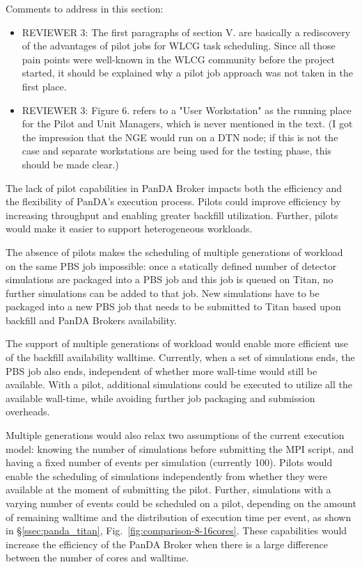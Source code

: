 \ifreview
Comments to address in this section:
\begin{itemize}
	\color{red} 
	\item REVIEWER 3: The first paragraphs of section V. are basically a
	rediscovery of the advantages of pilot jobs for WLCG task scheduling.
	Since all those pain points were well-known in the WLCG community before
	the project started, it should be explained why a pilot job approach was
	not taken in the first place.
	\item REVIEWER 3: Figure 6. refers to a "User Workstation" as the running
	place for the Pilot and Unit Managers, which is never mentioned in the
	text. (I got the impression that the NGE would run on a DTN node; if this
	is not the case and separate workstations are being used for the testing
	phase, this should be made clear.)
\end{itemize}
\fi

The lack of pilot capabilities in PanDA Broker impacts both the efficiency
and the flexibility of PanDA's execution process. Pilots could improve
efficiency by increasing throughput and enabling greater backfill
utilization. Further, pilots would make it easier to support heterogeneous
workloads.

The absence of pilots makes the scheduling of multiple generations of
workload on the same PBS job impossible: once a statically defined number of
detector simulations are packaged into a PBS job and this job is queued on
Titan, no further simulations can be added to that job. New simulations have
to be packaged into a new PBS job that needs to be submitted to Titan based
upon backfill and PanDA Brokers availability.

The support of multiple generations of workload would enable more efficient
use of the backfill availability walltime. Currently, when a set of
simulations ends, the PBS job also ends, independent of whether more
wall-time would still be available. With a pilot, additional simulations
could be executed to utilize all the available wall-time, while avoiding
further job packaging and submission overheads.

Multiple generations would also relax two assumptions of the current
execution model: knowing the number of simulations before submitting the MPI
script, and having a fixed number of events per simulation (currently 100).
Pilots would enable the scheduling of simulations independently from whether
they were available at the moment of submitting the pilot. Further,
simulations with a varying number of events could be scheduled on a pilot,
depending on the amount of remaining walltime and the distribution of
execution time per event, as shown in \S\ref{ssec:panda_titan},
Fig.~\ref{fig:comparison-8-16cores}. These capabilities would increase the
efficiency of the PanDA Broker when there is a large difference between the
number of cores and walltime.

